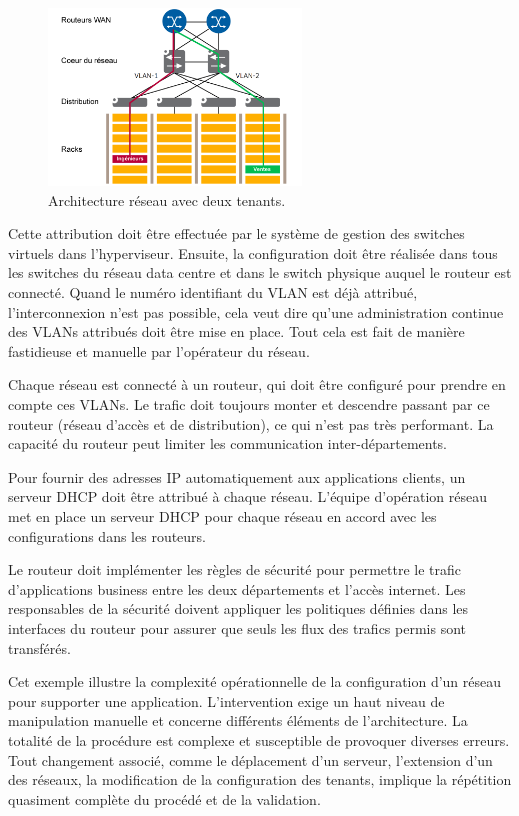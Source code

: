 \begin{figure}[h]
\begin{center}
\includegraphics[width=0.6\textwidth]{images/AspecMultiTenant_T} 
\caption{Architecture réseau avec deux tenants. \cite{leveragingSDNCloudNetworkServiceExample}} \label{AspecMultiTenant}
\end{center}
\end{figure} 

Cette attribution doit être effectuée par le système de gestion des switches virtuels dans l'hyperviseur. Ensuite, la configuration doit être réalisée dans tous les switches du réseau data centre et dans le switch physique auquel le routeur est connecté. Quand le numéro identifiant du VLAN est déjà attribué, l'interconnexion n'est pas possible, cela veut dire qu'une administration continue des VLANs attribués doit être mise en place. Tout cela est fait de manière fastidieuse et manuelle par l'opérateur du réseau.

Chaque réseau est connecté à un routeur, qui doit être configuré pour prendre en compte ces VLANs. Le trafic doit toujours monter et descendre passant par ce routeur (réseau d'accès et de distribution), ce qui n'est pas très performant. La capacité du routeur peut limiter les communication inter-départements. 

Pour fournir des adresses IP automatiquement aux applications clients, un serveur DHCP doit être attribué à chaque réseau. L'équipe d'opération réseau met en place un serveur DHCP pour chaque réseau en accord avec les configurations dans les routeurs.

Le routeur doit implémenter les règles de sécurité pour permettre le trafic d'applications business entre les deux départements et l'accès internet. Les responsables de la sécurité doivent appliquer les politiques définies dans les interfaces du routeur pour assurer que seuls les flux des trafics permis sont transférés.

Cet exemple illustre la complexité opérationnelle de la configuration d'un réseau pour supporter une application. L'intervention exige un haut niveau de manipulation manuelle et concerne différents éléments de l'architecture. La totalité de la procédure est complexe et susceptible de provoquer diverses erreurs. Tout changement associé, comme le déplacement d'un serveur, l'extension d'un des réseaux, la modification de la configuration des tenants, implique la répétition quasiment complète du procédé et de la validation.

